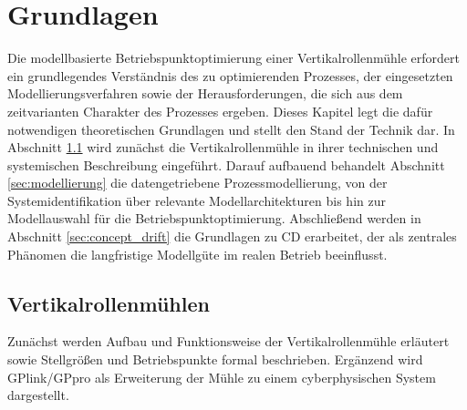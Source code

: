 
\chapter{Grundlagen} \label{cap:grundlagen}
Die modellbasierte Betriebspunktoptimierung einer Vertikalrollenmühle erfordert ein grundlegendes Verständnis des zu optimierenden Prozesses, der eingesetzten Modellierungsverfahren sowie der Herausforderungen, die sich aus dem zeitvarianten Charakter des Prozesses ergeben. Dieses Kapitel legt die dafür notwendigen theoretischen Grundlagen und stellt den Stand der Technik dar. In Abschnitt \ref{sec:muehle} wird zunächst die Vertikalrollenmühle in ihrer technischen und systemischen Beschreibung eingeführt. Darauf aufbauend behandelt Abschnitt \ref{sec:modellierung} die datengetriebene Prozessmodellierung, von der Systemidentifikation über relevante Modellarchitekturen bis hin zur Modellauswahl für die Betriebspunktoptimierung. Abschließend werden in Abschnitt \ref{sec:concept_drift} die Grundlagen zu \ac{CD} erarbeitet, der als zentrales Phänomen die langfristige Modellgüte im realen Betrieb beeinflusst.
%
\section{Vertikalrollenmühlen} \label{sec:muehle}
Zunächst werden Aufbau und Funktionsweise der Vertikalrollenmühle erläutert sowie Stellgrößen und Betriebspunkte formal beschrieben. Ergänzend wird GPlink/GPpro als Erweiterung der Mühle zu einem cyberphysischen System dargestellt.
%
